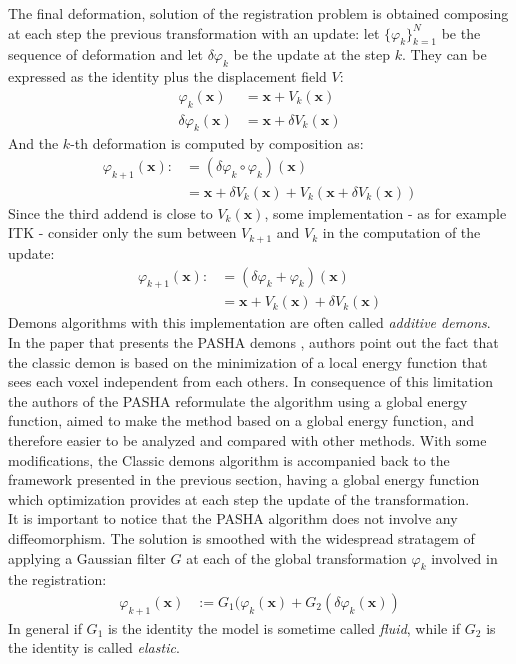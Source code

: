 The final deformation, solution of the registration problem is obtained composing at each step the previous transformation with an update: let $\{\varphi_{k}\}_{k=1}^{N}$ be the sequence of deformation and let $\delta \varphi_{k}$ be the update at the step $k$. They can be expressed as the identity plus the displacement field $V$:
\begin{align*}
	\varphi_{k}(\mathbf{x}) &= \mathbf{x} + V_{k}(\mathbf{x}) \\ 
	\delta \varphi_{k}(\mathbf{x}) &= \mathbf{x} + \delta V_{k}(\mathbf{x}) 
\end{align*}
And the $k$-th deformation is computed by composition as:
\begin{align*}
\varphi_{k+1}(\mathbf{x})  :&= (\delta \varphi_{k}\circ \varphi_{k})(\mathbf{x}) \\
&= \mathbf{x} + \delta V_{k}(\mathbf{x}) + V_{k}(\mathbf{x} + \delta V_{k}(\mathbf{x}))
\end{align*}
Since the third addend is close to $V_{k}(\mathbf{x})$, some implementation - as for example ITK - consider only the sum between 
$ V_{k+1}$ and $V_{k}$ in the computation of the update:
\begin{align*}
\varphi_{k+1}(\mathbf{x})  :&= (\delta \varphi_{k} + \varphi_{k})(\mathbf{x}) \\
&= \mathbf{x} + V_{k}(\mathbf{x}) + \delta V_{k}(\mathbf{x})
\end{align*}
Demons algorithms with this implementation are often called \emph{additive demons}.\\

In the paper that presents the PASHA demons \cite{cachier2003iconic}, authors point out the fact that the classic demon is based on the minimization of a local energy function that sees each voxel independent from each others. In consequence of this limitation the authors of the PASHA reformulate the algorithm using a global energy function, aimed to make the method based on a global energy function, and therefore easier to be analyzed and compared with other methods. With some modifications, the Classic demons algorithm is accompanied back to the framework presented in the previous section, having a global energy function which optimization provides at each step the update of the transformation. \\

It is important to notice that the PASHA algorithm does not involve any diffeomorphism. The solution is smoothed with the widespread stratagem of applying a Gaussian filter $G$ at each of the global transformation $\varphi_{k}$ involved in the registration:
\begin{align*}
\varphi_{k+1}(\mathbf{x})  &:= G_{1}(\varphi_{k}(\mathbf{x}) + G_{2}(\delta \varphi_{k}(\mathbf{x}))
\end{align*}
In general if $G_{1}$ is the identity the model is sometime called \emph{fluid}, while if $G_{2}$ is the identity is called \emph{elastic}.\\

